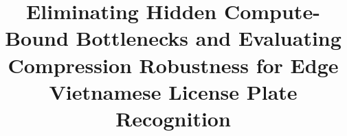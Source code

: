 \documentclass[pdflatex,sn-mathphys-num]{sn-jnl}
\begin{document}
\title[Edge Vietnamese ALPR Optimization and Robustness Benchmark]{Eliminating Hidden Compute-Bound Bottlenecks and Evaluating Compression Robustness for Edge Vietnamese License Plate Recognition}

\author*[1]{ }
\author[1]{ }
\author[1]{ }
\author[1]{ }
\author[1]{ }
\author[1]{ }

\end{document}
